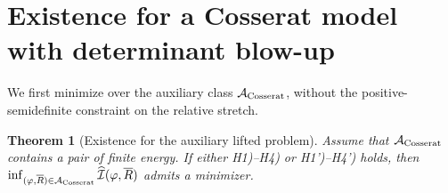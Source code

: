 \documentclass[11pt]{article}
\newtheorem{theorem}{Theorem}[section]
\begin{document}
\section{Existence for a Cosserat model with determinant blow-up}
\label{s3}\setcounter{equation}{0}


We first minimize over the auxiliary class $\mathcal A_{\rm Cosserat}$, without the positive-semidefinite constraint on the relative stretch.

\begin{theorem}[Existence for the auxiliary lifted problem]
\label{thm:elastic2}
Assume that $\mathcal A_{\rm Cosserat}$ contains a pair of finite energy. If either H1)--H4) or H1')--H4') holds, then
$
\inf_{(\varphi, \overline R )\in\mathcal A_{\rm Cosserat}}
\widehat{\mathcal I}(\varphi, \overline R )
$
admits a minimizer.
\end{theorem}
\end{document}
